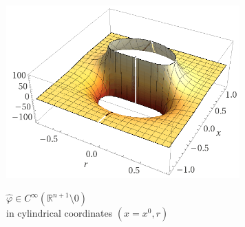 \documentclass[beamer,10pt]{standalone}
\begin{document}
\begin{frame}
\begin{propblock}
\begin{columns}[T]
\begin{column}{.50\linewidth}
\begin{flushright}
\begin{figure}
						\href{http://shorturl.at/hxFR5}{\includegraphics[width=0.8\textwidth]{Pictures/Figure_primitivePlot.png}}
  					\caption*{$\hat{\varphi}\in C^\infty (\mathbb{R}^{n+1}\setminus{0})$ \\ in cylindrical coordinates $(x=x^0,r)$}
					\end{figure}							
				\end{flushright}
				\vspace{-3.5ex}
	 	 	\end{column}
 	 \end{columns}
	\end{propblock}
\end{frame}
\end{document}
